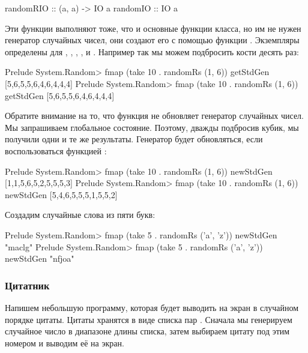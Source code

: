 \begin{code}
    randomRIO   :: (a, a) -> IO a
    randomIO    :: IO a
\end{code}

Эти функции выполняют тоже, что и основные функции
класса, но им не нужен генератор случайных чисел, они
создают его с помощью функции .
Экземпляры  определены для 
, , , , 	и
. Например так мы можем подбросить кости
десять раз:

\begin{code}
Prelude System.Random> fmap (take 10 . randomRs (1, 6)) getStdGen
[5,6,5,5,6,4,6,4,4,4]
Prelude System.Random> fmap (take 10 . randomRs (1, 6)) getStdGen
[5,6,5,5,6,4,6,4,4,4]
\end{code}

Обратите внимание на то, что функция  не
обновляет генератор случайных чисел. Мы запрашиваем 
глобальное состояние. Поэтому, дважды подбросив кубик,
мы получили одни и те же результаты. Генератор 
будет обновляться, если воспользоваться функцией
:

\begin{code}
Prelude System.Random> fmap (take 10 . randomRs (1, 6)) newStdGen
[1,1,5,6,5,2,5,5,5,3]
Prelude System.Random> fmap (take 10 . randomRs (1, 6)) newStdGen
[5,4,6,5,5,5,1,5,5,2]
\end{code}

Создадим случайные слова из пяти букв:

\begin{code}
Prelude System.Random> fmap (take 5 . randomRs ('a', 'z')) newStdGen
"maclg"
Prelude System.Random> fmap (take 5 . randomRs ('a', 'z')) newStdGen
"nfjoa"
\end{code}


\subsubsection{Цитатник}

Напишем небольшую программу, которая будет выводить
на экран в случайном порядке цитаты. Цитаты хранятся
в виде списка пар . Сначала
мы генерируем случайное число в диапазоне длины списка,
затем выбираем цитату под этим номером и выводим её
на экран. 


